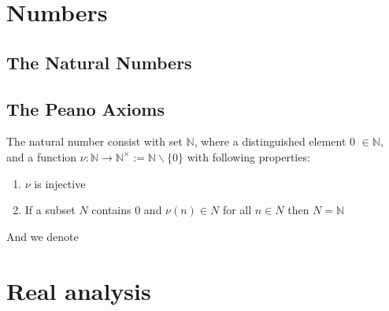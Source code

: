 \documentclass{article}
\newcommand{\N}{\mathbb{N}}
\begin{document}
\section{Numbers}
\subsection{The Natural Numbers}
\subsection{The Peano Axioms}
The natural number consist with set $\N$, where a distinguished element 0 $\in \N$, and a function $\nu : \N \to \N^{\times}:=\N \backslash \{0\}$ with following properties:
\begin{enumerate}
	\item $\nu$ is injective
	\item If a subset $N$ contains 0 and $\nu(n)\in N$ for all $n\in N$ then $N=\N$ 
\end{enumerate}

And we denote 






\section{Real analysis}
\end{document}
